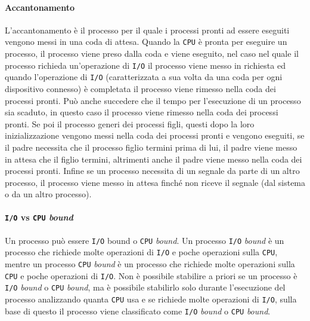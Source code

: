             \paragraph{Accantonamento}
                L'accantonamento è il processo per il quale i processi pronti ad essere eseguiti vengono messi in una coda di attesa. Quando la \texttt{CPU} è pronta per eseguire un processo, il processo viene preso dalla coda e viene eseguito, nel caso nel quale il processo richieda un'operazione di \texttt{I/O} il processo viene messo in richiesta ed quando l'operazione di \texttt{I/O} (caratterizzata a sua volta da una coda per ogni dispositivo connesso) è completata il processo viene rimesso nella coda dei processi pronti.\newline 
                Può anche succedere che il tempo per l'esecuzione di un processo sia scaduto, in questo caso il processo viene rimesso nella coda dei processi pronti. Se poi il processo generi dei processi figli, questi dopo la loro inizializzazione vengono messi nella coda dei processi pronti e vengono eseguiti, se il padre necessita che il processo figlio termini prima di lui, il padre viene messo in attesa che il figlio termini, altrimenti anche il padre viene messo nella coda dei processi pronti. Infine se un processo necessita di un segnale da parte di un altro processo, il processo viene messo in attesa finché non riceve il segnale (dal sistema o da un altro processo).
            \paragraph{\texttt{I/O} vs \texttt{CPU} \textit{bound}}
                Un processo può essere \texttt{I/O} bound o \texttt{CPU} \textit{bound}. Un processo \texttt{I/O} \textit{bound} è un processo che richiede molte operazioni di \texttt{I/O} e poche operazioni sulla \texttt{CPU}, mentre un processo \texttt{CPU} \textit{bound} è un processo che richiede molte operazioni sulla \texttt{CPU} e poche operazioni di \texttt{I/O}. Non è possibile stabilire a priori se un processo è \texttt{I/O} \textit{bound} o \texttt{CPU} \textit{bound}, ma è possibile stabilirlo solo durante l'esecuzione del processo analizzando quanta \texttt{CPU} usa e se richiede molte operazioni di \texttt{I/O}, sulla base di questo il processo viene classificato come \texttt{I/O} \textit{bound} o \texttt{CPU} \textit{bound}.
